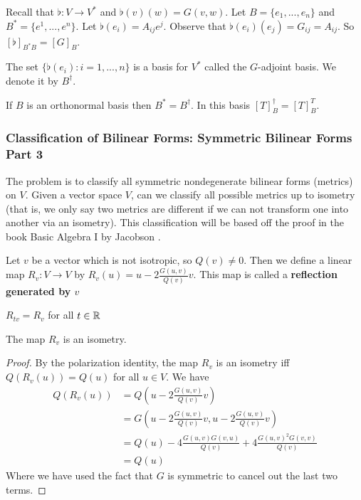 Recall that $\flat : V \to V^*$ and $\flat(v)(w) = G(v,w)$. Let $B = \{e_1,...,e_n\}$ and $B^* = \{e^1,...,e^n\}$.
Let $\flat(e_i) = A_{ij} e^j$. Observe that $\flat(e_i)(e_j) = G_{ij} = A_{ij}$. So $[\flat]_{B^* B} = [G]_B$.
\begin{defn}The set $\{\flat(e_i) : i =1,...,n\}$ is a basis for $V^*$ called the $G$-adjoint basis. We denote it by $B^\dagger$.\end{defn}
\begin{remark*}
    If $B$ is an orthonormal basis then $B^* = B^\dagger$. In this basis $[T]^\dagger_B = [T]^T_B$.
\end{remark*}

\subsubsection{Classification of Bilinear Forms: Symmetric Bilinear Forms Part 3}
The problem is to classify all symmetric nondegenerate bilinear forms (metrics) on $V$. Given a vector space $V$, can we classify all possible metrics up to isometry (that is, we only say two metrics are different if we can not transform one into another via an isometry). This classification will be based off the proof in the book Basic Algebra I by Jacobson \cite{Jacobson2009-pp}.

\begin{defn}[Reflection] Let $v$ be a vector which is not isotropic, so $Q(v)\neq 0$. Then we define a linear map $R_v : V \to V$ by $R_v(u) = u-2\frac{G(u,v)}{Q(v)}v$. This map is called a \textbf{reflection generated by $v$}
\end{defn}
\begin{remark*}
    $R_{tv} = R_v$ for all $t\in\operatorname{\mathbb{R}}$
\end{remark*}
\begin{lemma}
 The map $R_v$ is an isometry.   
\end{lemma}
\begin{proof}
    By the polarization identity, the map $R_v$ is an isometry iff $Q(R_v(u))=Q(u)$ for all $u\in V$. We have
    \begin{align*}
        Q(R_v(u))&=Q\left(u-2\frac{G(u,v)}{Q(v)}v\right)\\
        &= G\left(u-2\frac{G(u,v)}{Q(v)}v,u-2\frac{G(u,v)}{Q(v)}v\right)\\
        &= Q(u) - 4\frac{G(u,v)G(v,u)}{Q(v)}+4\frac{G(u,v)^2G(v,v)}{Q(v)}\\
        &= Q(u)
    \end{align*}
    Where we have used the fact that $G$ is symmetric to cancel out the last two terms. 
\end{proof}

